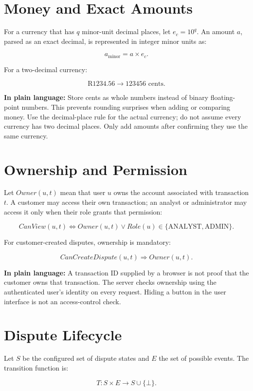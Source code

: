 \documentclass[11pt,a4paper]{article}
\begin{document}
\section{Money and Exact Amounts}

For a currency that has \(q\) minor-unit decimal places, let
\(e_c=10^q\). An amount \(a\), parsed as an exact decimal, is represented
in integer minor units as:

\[
a_{\mathrm{minor}} = a \times e_c.
\]

For a two-decimal currency:

\[
\text{R}1234.56 \longrightarrow 123456\text{ cents}.
\]

\textbf{In plain language:} Store cents as whole numbers instead of
binary floating-point numbers. This prevents rounding surprises when
adding or comparing money. Use the decimal-place rule for the actual
currency; do not assume every currency has two decimal places. Only add
amounts after confirming they use the same currency.

\section{Ownership and Permission}

Let \(Owner(u,t)\) mean that user \(u\) owns the account associated with
transaction \(t\). A customer may access their own transaction; an
analyst or administrator may access it only when their role grants that
permission:

\[
CanView(u,t)
\iff
Owner(u,t)
\lor
Role(u)\in\{\text{ANALYST},\text{ADMIN}\}.
\]

For customer-created disputes, ownership is mandatory:

\[
CanCreateDispute(u,t)
\Rightarrow
Owner(u,t).
\]

\textbf{In plain language:} A transaction ID supplied by a browser is
not proof that the customer owns that transaction. The server checks
ownership using the authenticated user's identity on every request.
Hiding a button in the user interface is not an access-control check.

\section{Dispute Lifecycle}

Let \(S\) be the configured set of dispute states and \(E\) the set of
possible events. The transition function is:

\[
T:S\times E\rightarrow S\cup\{\bot\}.
\]
\end{document}
